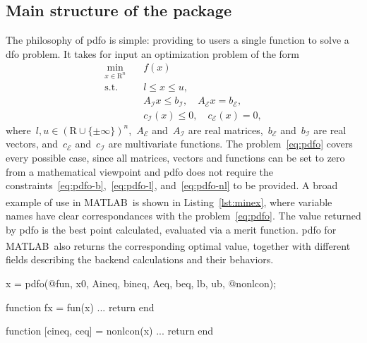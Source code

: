 \documentclass[11pt,draft]{article}
\numberwithin{equation}{section}
\def\R{\ensuremath{\mathds{R}}}
\newcommand\set[2][]{#1\{#2#1\}}
\def\obj{\ensuremath{f}}
\def\bl{\ensuremath{l}}
\def\bu{\ensuremath{u}}
\newcommand\cgen[1][i]{c_{#1}}
\def\ceq{\ensuremath{\cgen[\scriptscriptstyle\mathcal{E}]}}
\def\cub{\ensuremath{\cgen[\scriptscriptstyle\mathcal{I}]}}
\def\aeq{\ensuremath{A_{\scriptscriptstyle\mathcal{E}}}}
\def\beq{\ensuremath{b_{\scriptscriptstyle\mathcal{E}}}}
\def\aub{\ensuremath{A_{\scriptscriptstyle\mathcal{I}}}}
\def\bub{\ensuremath{b_{\scriptscriptstyle\mathcal{I}}}}
\def\R{\mbox{R}}
\def\matlab{\mbox{MATLAB\textsuperscript{\textregistered}}}
\begin{document}
\subsection{Main structure of the package}

The philosophy of \gls{pdfo} is simple: providing to users a single function to solve a \gls{dfo} problem.
It takes for input an optimization problem of the form
\begin{subequations}
    \label{eq:pdfo}
    \begin{align}
        \min_{x \in \R^n}   & \quad \obj(x)\\
        \text{s.t.}         & \quad \bl \le x \le \bu, \label{eq:pdfo-b}\\
        & \quad \aub x \le \bub, \quad \aeq x = \beq, \label{eq:pdfo-l}\\
        & \quad \cub(x) \le 0, \quad \ceq(x) = 0, \label{eq:pdfo-nl}
    \end{align}
\end{subequations}
where~$\bl, \bu \in (\R \cup \set{\pm \infty})^n$,~$\aeq$ and~$\aub$ are real matrices,~$\beq$ and~$\bub$ are real vectors, and~$\ceq$ and~$\cub$ are multivariate functions.
The problem~\eqref{eq:pdfo} covers every possible case, since all matrices, vectors and functions can be set to zero from a mathematical viewpoint and \gls{pdfo} does not require the constraints~\eqref{eq:pdfo-b},~\eqref{eq:pdfo-l}, and~\eqref{eq:pdfo-nl} to be provided.
A broad example of use in \matlab\ is shown in Listing~\ref{lst:minex}, where variable names have clear correspondances with the problem~\eqref{eq:pdfo}.
The value returned by \gls{pdfo} is the best point calculated, evaluated via a merit function.
\gls{pdfo} for \matlab\ also returns the corresponding optimal value, together with different fields describing the backend calculations and their behaviors.

\begin{matlablst}[%
    caption=An elementary example of PDFO in \matlab.,
    label=lst:minex
]
    x = pdfo(@fun, x0, Aineq, bineq, Aeq, beq, lb, ub, @nonlcon);

    function fx = fun(x)
    ...
    return
    end

    function [cineq, ceq] = nonlcon(x)
    ...
    return
    end
\end{matlablst}
\end{document}

